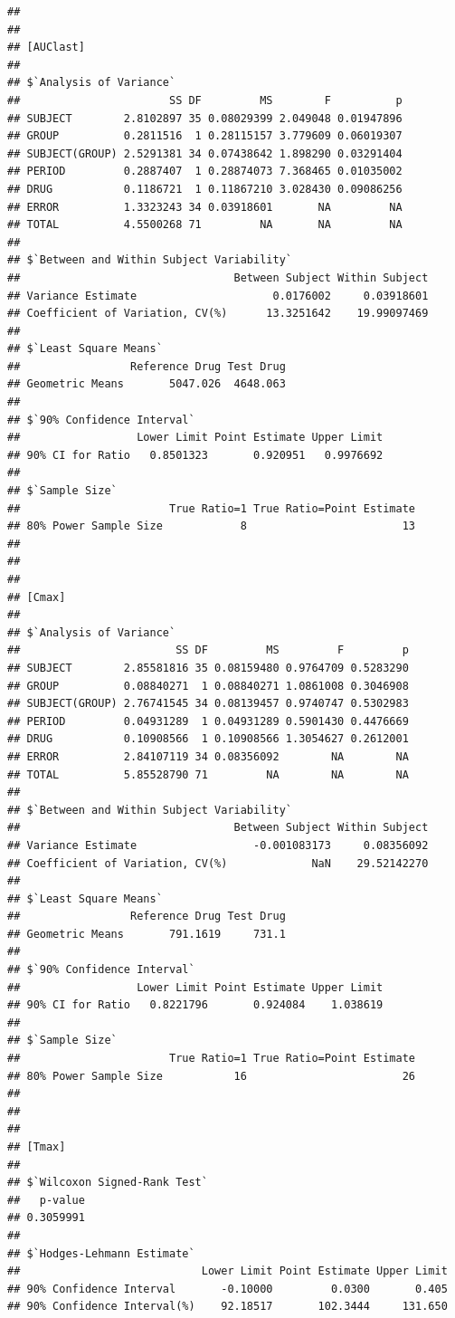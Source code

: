 \documentclass[12pt,]{krantz}
\theoremstyle{definition}
\theoremstyle{definition}
\theoremstyle{definition}
\theoremstyle{remark}
\begin{document}
\begin{verbatim}
## 
## 
## [AUClast]
## 
## $`Analysis of Variance`
##                       SS DF         MS        F          p
## SUBJECT        2.8102897 35 0.08029399 2.049048 0.01947896
## GROUP          0.2811516  1 0.28115157 3.779609 0.06019307
## SUBJECT(GROUP) 2.5291381 34 0.07438642 1.898290 0.03291404
## PERIOD         0.2887407  1 0.28874073 7.368465 0.01035002
## DRUG           0.1186721  1 0.11867210 3.028430 0.09086256
## ERROR          1.3323243 34 0.03918601       NA         NA
## TOTAL          4.5500268 71         NA       NA         NA
## 
## $`Between and Within Subject Variability`
##                                 Between Subject Within Subject
## Variance Estimate                     0.0176002     0.03918601
## Coefficient of Variation, CV(%)      13.3251642    19.99097469
## 
## $`Least Square Means`
##                 Reference Drug Test Drug
## Geometric Means       5047.026  4648.063
## 
## $`90% Confidence Interval`
##                  Lower Limit Point Estimate Upper Limit
## 90% CI for Ratio   0.8501323       0.920951   0.9976692
## 
## $`Sample Size`
##                       True Ratio=1 True Ratio=Point Estimate
## 80% Power Sample Size            8                        13
## 
## 
## 
## [Cmax]
## 
## $`Analysis of Variance`
##                        SS DF         MS         F         p
## SUBJECT        2.85581816 35 0.08159480 0.9764709 0.5283290
## GROUP          0.08840271  1 0.08840271 1.0861008 0.3046908
## SUBJECT(GROUP) 2.76741545 34 0.08139457 0.9740747 0.5302983
## PERIOD         0.04931289  1 0.04931289 0.5901430 0.4476669
## DRUG           0.10908566  1 0.10908566 1.3054627 0.2612001
## ERROR          2.84107119 34 0.08356092        NA        NA
## TOTAL          5.85528790 71         NA        NA        NA
## 
## $`Between and Within Subject Variability`
##                                 Between Subject Within Subject
## Variance Estimate                  -0.001083173     0.08356092
## Coefficient of Variation, CV(%)             NaN    29.52142270
## 
## $`Least Square Means`
##                 Reference Drug Test Drug
## Geometric Means       791.1619     731.1
## 
## $`90% Confidence Interval`
##                  Lower Limit Point Estimate Upper Limit
## 90% CI for Ratio   0.8221796       0.924084    1.038619
## 
## $`Sample Size`
##                       True Ratio=1 True Ratio=Point Estimate
## 80% Power Sample Size           16                        26
## 
## 
## 
## [Tmax]
## 
## $`Wilcoxon Signed-Rank Test`
##   p-value 
## 0.3059991 
## 
## $`Hodges-Lehmann Estimate`
##                            Lower Limit Point Estimate Upper Limit
## 90% Confidence Interval       -0.10000         0.0300       0.405
## 90% Confidence Interval(%)    92.18517       102.3444     131.650
\end{verbatim}
\end{document}
